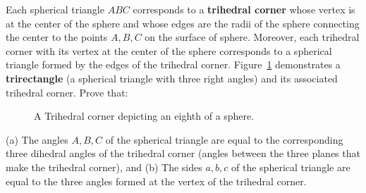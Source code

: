 \begin{tcolorbox}[title={Trihedral Corner}]
\begin{question}
    Each spherical triangle $ABC$ corresponds to a \textbf{trihedral corner} whose vertex is at the center of the sphere and whose edges are the radii of the sphere connecting the center to the points $A,B,C$ on the surface of sphere. Moreover, each trihedral corner with its vertex at the center of the sphere corresponds to a spherical triangle formed by the edges of the trihedral corner. Figure~\ref{fig:trihedral} demonstrates a \textbf{trirectangle} (a spherical triangle with three right angles) and its associated trihedral corner. Prove that:
    \begin{figure}[H]
        \centering
        \caption{A Trihedral corner depicting an eighth of a sphere.}
        \label{fig:trihedral}
    \end{figure}
        (a) The angles $A,B,C$ of the spherical triangle are equal to the corresponding three dihedral angles of the trihedral corner (angles between the three planes that make the trihedral corner), and
        (b) The sides $a,b,c$ of the spherical triangle are equal to the three angles formed at the vertex of the trihedral corner.
\end{question}
\end{tcolorbox}

